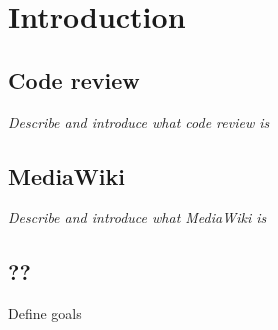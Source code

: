 \chapter{Introduction\label{chap:introduction}}

\section{Code review}
\em{Describe and introduce what code review is}

\section{MediaWiki}
\em{Describe and introduce what MediaWiki is}

\section{??}

Define goals








